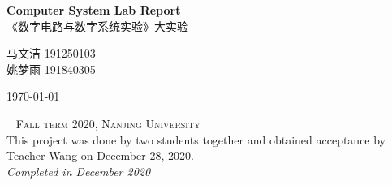 \begingroup
\thispagestyle{empty}
\centering
\vspace*{5cm}
\par\normalfont\fontsize{35}{35}\sffamily\selectfont
\textbf{Computer System Lab Report}\\
{\LARGE \kaishu《数字电路与数字系统实验》大实验}\par %
\vspace*{1cm}
{\Large\kaishu 马文洁 191250103\\姚梦雨 191840305}\par %
\Large
\today
\endgroup

\newpage
~\vfill
\thispagestyle{empty}
\noindent \textsc{Fall term 2020, Nanjing University}\\

\noindent This project was done by two students together and obtained acceptance by Teacher Wang on December 28, 2020.\\ 

\noindent \textit{Completed in December 2020}
